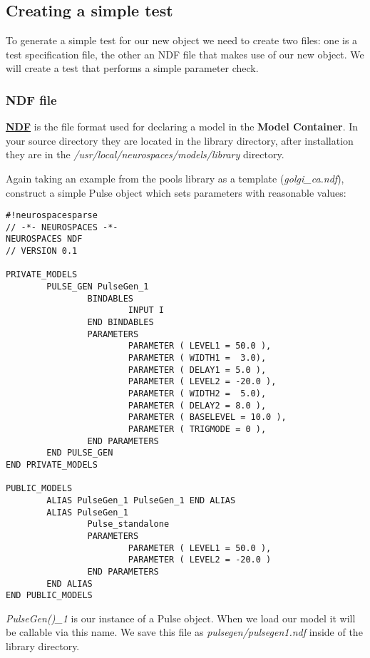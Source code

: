\documentclass[12pt]{article}
\begin{document}
\subsection*{Creating a simple test}

To generate a simple test for our new object we need to create two files: one is a test specification file, the other an NDF file that makes use of our new object. We will create a test that performs a simple parameter check.

\subsubsection*{NDF file}

\href{../ndf-file-format/ndf-file-format.tex}{\bf NDF} is the file format used for declaring a model in the {\bf Model Container}. In your source directory they are located in the library directory, after installation they are in the {\it /usr/local/neurospaces/models/library} directory.

Again taking an example from the pools library as a template ({\it golgi\_ca.ndf}), construct a simple Pulse object which sets parameters with reasonable values:
\begin{verbatim}
#!neurospacesparse
// -*- NEUROSPACES -*-
NEUROSPACES NDF
// VERSION 0.1

PRIVATE_MODELS
        PULSE_GEN PulseGen_1
                BINDABLES
                        INPUT I
                END BINDABLES
                PARAMETERS
                        PARAMETER ( LEVEL1 = 50.0 ),
                        PARAMETER ( WIDTH1 =  3.0),
                        PARAMETER ( DELAY1 = 5.0 ),
                        PARAMETER ( LEVEL2 = -20.0 ),
                        PARAMETER ( WIDTH2 =  5.0),
                        PARAMETER ( DELAY2 = 8.0 ),
                        PARAMETER ( BASELEVEL = 10.0 ),
                        PARAMETER ( TRIGMODE = 0 ),
                END PARAMETERS
        END PULSE_GEN
END PRIVATE_MODELS

PUBLIC_MODELS
        ALIAS PulseGen_1 PulseGen_1 END ALIAS
        ALIAS PulseGen_1 
                Pulse_standalone
                PARAMETERS
                        PARAMETER ( LEVEL1 = 50.0 ),
                        PARAMETER ( LEVEL2 = -20.0 )
                END PARAMETERS
        END ALIAS
END PUBLIC_MODELS
\end{verbatim}
{\it PulseGen()\_1} is our instance of a Pulse object. When we load our model it will be callable via this name. We save this file as {\it pulsegen/pulsegen1.ndf} inside of the library directory.
\end{document}
